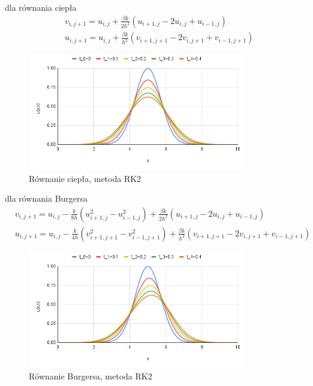\documentclass[a4paper,12pt]{article}
\begin{document}
	dla równania ciepła
	\begin{equation}
		\begin{split}
			& v_{i,j+1}=u_{i,j}+\frac{\beta k}{2h^{2}}(u_{i+1,j}-2u_{i,j}+u_{i-1,j})\\
			& u_{i,j+1}=u_{i,j}+\frac{\beta k}{h^{2}}(v_{i+1,j+1}-2v_{i,j+1}+v_{i-1,j+1})
		\end{split}
	\end{equation}
	\begin{figure}[h]
		\caption{Równanie ciepła, metoda RK2}
		\centering
		\includegraphics[width=0.85\textwidth]{rys/6.png}
	\end{figure}
	
	dla równania Burgersa
	\begin{equation}
		\begin{split}
			& v_{i,j+1}=u_{i,j}-\frac{k}{8h}(u_{i+1,j}^{2}-u_{i-1,j}^{2})+\frac{\beta k}{2h^{2}}(u_{i+1,j}-2u_{i,j}+u_{i-1,j})\\
			& u_{i,j+1}=u_{i,j}-\frac{k}{4h}(v_{i+1,j+1}^{2}-v_{i-1,j+1}^{2})+\frac{\beta k}{h^{2}}(v_{i+1,j+1}-2v_{i,j+1}+v_{i-1,j+1})
		\end{split}
	\end{equation}
	\begin{figure}[h]
		\caption{Równanie Burgersa, metoda RK2}
		\centering
		\includegraphics[width=0.85\textwidth]{rys/7.png}
	\end{figure}
	\newpage
	
\end{document}
